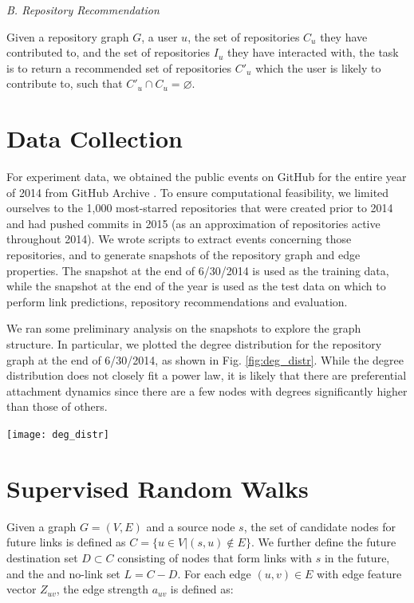 \documentclass[10pt]{article}
\newenvironment{Figure}
  {\par\medskip\noindent\minipage{\linewidth}}
  {\endminipage\par\medskip}
\begin{document}
\begin{multicols}{2}
\textit{B. Repository Recommendation}

Given a repository graph $G$, a user $u$, the set of repositories $C_u$ they have contributed to, and the set of repositories $I_u$ they have interacted with, the task is to return a recommended set of repositories $C'_u$ which the user is likely to contribute to, such that $C'_u \cap C_u = \varnothing$.

\section{Data Collection}

For experiment data, we obtained the public events on GitHub for the entire year of 2014 from GitHub Archive \cite{gha}. To ensure computational feasibility, we limited ourselves to the 1,000 most-starred repositories that were created prior to 2014 and had pushed commits in 2015 (as an approximation of repositories active throughout 2014). We wrote scripts to extract events concerning those repositories, and to generate snapshots of the repository graph and edge properties. The snapshot at the end of 6/30/2014 is used as the training data, while the snapshot at the end of the year is used as the test data on which to perform link predictions, repository recommendations and evaluation.

We ran some preliminary analysis on the snapshots to explore the graph structure. In particular, we plotted the degree distribution for the repository graph at the end of 6/30/2014, as shown in Fig. \ref{fig:deg_distr}. While the degree distribution does not closely fit a power law, it is likely that there are preferential attachment dynamics since there are a few nodes with degrees significantly higher than those of others.

\begin{Figure}
\centering
\texttt{[image: deg\_distr]}
\label{fig:deg_distr}
\end{Figure}

\section{Supervised Random Walks}

Given a graph $G = (V, E)$ and a source node $s$, the set of candidate nodes for future links is defined as $C = \{ u \in V\vert (s, u) \not\in E  \}$. We further define the future destination set $D \subset C$ consisting of nodes that form links with $s$ in the future, and the and no-link set $L = C - D$. For each edge $(u, v) \in E$ with edge feature vector $Z_{uv}$, the edge strength $a_{uv}$ is defined as:


\end{multicols}
\end{document}
